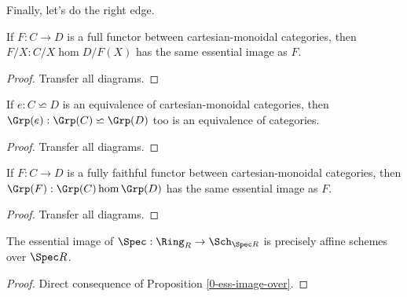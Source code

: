 Finally, let's do the right edge.


\begin{proposition}
  \label{0-ess-image-over}
  \uses{}
  \leanok

  If $F : C \to D$ is a full functor between cartesian-monoidal categories, then $F / X : C / X \hom D / F(X)$ has the same essential image as $F$.
\end{proposition}
\begin{proof}
  \uses{}
  \leanok

  Transfer all diagrams.
\end{proof}


\begin{proposition}
  \label{0-grp-equiv}
  \uses{}
  \leanok

  If $e : C \backsimeq D$ is an equivalence of cartesian-monoidal categories, then $\Grp(e) : \Grp(C) \backsimeq \Grp(D)$ too is an equivalence of categories.
\end{proposition}
\begin{proof}
  \uses{}
  \leanok

  Transfer all diagrams.
\end{proof}


\begin{proposition}
  \label{0-ess-image-grp}
  \uses{}
  \leanok

  If $F : C \to D$ is a fully faithful functor between cartesian-monoidal categories, then $\Grp(F) : \Grp(C) \hom \Grp(D)$ has the same essential image as $F$.
\end{proposition}
\begin{proof}

  Transfer all diagrams.
\end{proof}


\begin{proposition}
  \label{0-ess-image-spec-alg}
  \leanok

  The essential image of $\Spec : \Ring_R \to \Sch_{\Spec R}$ is precisely affine schemes over $\Spec R$.
\end{proposition}
\begin{proof}
  \leanok

  Direct consequence of Proposition \ref{0-ess-image-over}.
\end{proof}


